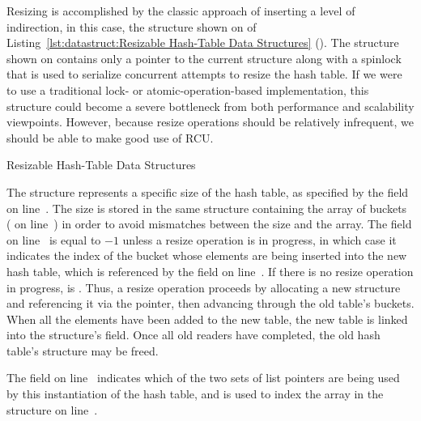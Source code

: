 \begin{fcvref}
Resizing is accomplished by the classic approach of inserting a level
of indirection, in this case, the  structure shown on
 of
Listing~\ref{lst:datastruct:Resizable Hash-Table Data Structures}
().
The  structure shown on
 contains only a
pointer to the current  structure along with a spinlock that
is used to serialize concurrent attempts to resize the hash table.
If we were to use a traditional lock- or atomic-operation-based
implementation, this  structure could become a severe bottleneck
from both performance and scalability viewpoints.
However, because resize operations should be relatively infrequent,
we should be able to make good use of RCU\@.

\begin{listing}[tb]

\caption{Resizable Hash-Table Data Structures}
\label{lst:datastruct:Resizable Hash-Table Data Structures}
\end{listing}

The  structure represents a specific size of the hash table,
as specified by the  field on line~.
The size is stored in the same structure containing the array of
buckets ( on
line~) in order to avoid mismatches between
the size and the array.
The  field on
line~ is equal to $-1$ unless a resize
operation
is in progress, in which case it indicates the index of the bucket whose
elements are being inserted into the new hash table, which is referenced
by the  field on line~.
If there is no resize operation in progress,  is .
Thus, a resize operation proceeds by allocating a new  structure
and referencing it via the  pointer, then advancing
 through the old table's buckets.
When all the elements have been added to the new table, the new
table is linked into the  structure's  field.
Once all old readers have completed, the old hash table's  structure
may be freed.

The  field on
line~ indicates which of the two sets of
list pointers are being used by this instantiation of the hash table,
and is used to index the  array in the 
structure on line~.


\end{fcvref}
